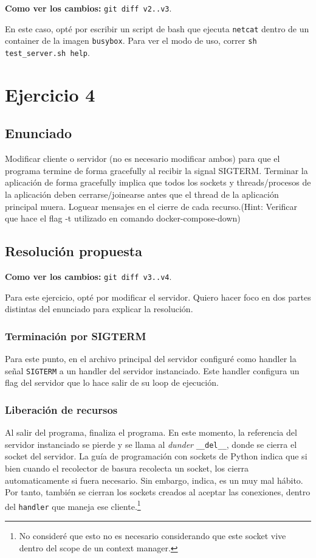 \documentclass{article}
\begin{document}
\textbf{Como ver los cambios: }\texttt{git diff v2..v3}.

En este caso, opté por escribir un script de bash que ejecuta \texttt{netcat} dentro de un container de la imagen \texttt{busybox}. Para ver el modo de uso, correr \texttt{sh test\_server.sh \-\-help}.

\section{Ejercicio 4}

\subsection{Enunciado}
Modificar cliente o servidor (no es necesario modificar ambos) para que el programa termine de forma gracefully al recibir la signal SIGTERM. Terminar la aplicación de forma gracefully implica que todos los sockets y threads/procesos de la aplicación deben cerrarse/joinearse antes que el thread de la aplicación principal muera. Loguear mensajes en el cierre de cada recurso.(Hint: Verificar que hace el flag -t utilizado en comando docker-compose-down)

\subsection{Resolución propuesta}

\textbf{Como ver los cambios: }\texttt{git diff v3..v4}.

Para este ejercicio, opté por modificar el servidor. Quiero hacer foco en dos partes distintas del enunciado para explicar la resolución.

\subsubsection{Terminación por SIGTERM}
Para este punto, en el archivo principal del servidor configuré como handler la señal \texttt{SIGTERM} a un handler del servidor instanciado\cite{signal}. Este handler configura un flag del servidor que lo hace salir de su loop de ejecución.

\subsubsection{Liberación de recursos}
Al salir del programa, finaliza el programa. En este momento, la referencia del servidor instanciado se pierde y se llama al \textit{dunder} \texttt{\_\_del\_\_}\cite{DelDunder}, donde se cierra el socket del servidor. La guía de programación con sockets de Python\cite{SocketHOWTO} indica que si bien cuando el recolector de basura recolecta un socket, los cierra automaticamente si fuera necesario. Sin embargo, indica, es un muy mal hábito. Por tanto, también se cierran los sockets creados al aceptar las conexiones, dentro del \texttt{handler} que maneja ese cliente.\footnote{No consideré que esto no es necesario considerando que este socket vive dentro del scope de un context manager.}
\end{document}
